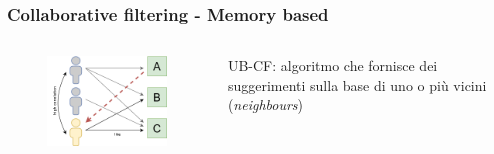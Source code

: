 \begin{frame}
    \frametitle{Collaborative filtering - Memory based}
    \begin{columns}
        \begin{column}{0.5\textwidth}
            \begin{figure}
                \centering
                \includegraphics[scale=0.5]{images/UB_CF_ex}
            \end{figure}
        \end{column}
        \begin{column}{0.5\textwidth}
            \alert{UB-CF}: algoritmo che fornisce dei suggerimenti sulla base di uno o più vicini (\textit{neighbours})
        \end{column}
    \end{columns}
\end{frame}

